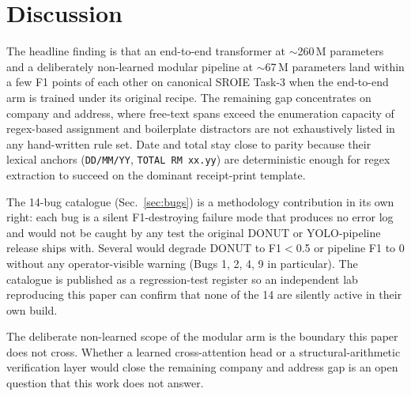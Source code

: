 \section{Discussion}
\label{sec:discussion}

The headline finding is that an end-to-end transformer at
$\sim$260\,M parameters and a deliberately non-learned modular
pipeline at $\sim$67\,M parameters land within a few F1 points of
each other on canonical SROIE Task-3 when the end-to-end arm is
trained under its original recipe.  The remaining gap concentrates
on \textsf{company} and \textsf{address}, where free-text spans
exceed the enumeration capacity of regex-based assignment and
boilerplate distractors are not exhaustively listed in any
hand-written rule set.  \textsf{Date} and \textsf{total} stay close
to parity because their lexical anchors (\texttt{DD/MM/YY},
\texttt{TOTAL\,RM\,xx.yy}) are deterministic enough for regex
extraction to succeed on the dominant receipt-print template.

The 14-bug catalogue (Sec.~\ref{sec:bugs}) is a methodology
contribution in its own right: each bug is a silent F1-destroying
failure mode that produces no error log and would not be caught by
any test the original DONUT or YOLO-pipeline release ships with.
Several would degrade DONUT to F1$<$0.5 or pipeline F1 to 0
without any operator-visible warning (Bugs 1, 2, 4, 9 in
particular).  The catalogue is published as a regression-test
register so an independent lab reproducing this paper can confirm
that none of the 14 are silently active in their own build.

The deliberate non-learned scope of the modular arm is the boundary
this paper does not cross.  Whether a learned cross-attention head
or a structural-arithmetic verification layer would close the
remaining \textsf{company} and \textsf{address} gap is an open
question that this work does not answer.
